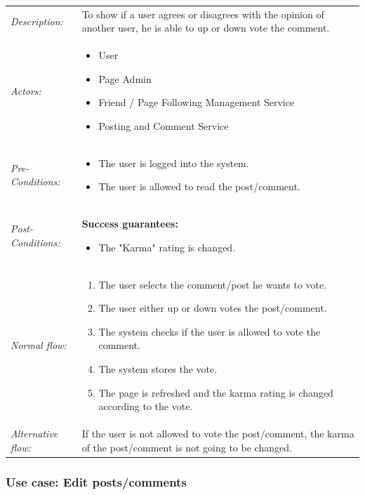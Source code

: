 \documentclass[11pt,a4paper]{report}
\begin{document}
\begin{longtable}{p{} | p{}}
        \hline
        \emph{Description:} & To show if a user agrees or disagrees with the opinion of another user, he is able to up or down vote the comment.\\
        \emph{Actors:} & 
            \begin{itemize} 
                \item User
                \item Page Admin
                \item Friend / Page Following Management Service
                \item Posting and Comment Service
             \end{itemize} \\
        \emph{Pre-Conditions:} & 
            \begin{itemize} 
                \item The user is logged into the system.
                \item The user is allowed to read the post/comment.
             \end{itemize} \\
        \emph{Post-Conditions:} & \textbf{Success guarantees:} 
            \begin{itemize} 
                \item The "Karma" rating is changed.
            \end{itemize} \\
        \emph{Normal flow:} & 
            \begin{enumerate} 
                \item The user selects the comment/post he wants to vote.
                \item The user either up or down votes the post/comment.
                \item The system checks if the user is allowed to vote the comment.
                \item The system stores the vote.
                \item The page is refreshed and the karma rating is changed according to the vote.
             \end{enumerate} \\
        \emph{Alternative flow:} & If the user is not allowed to vote the post/comment, the karma of the post/comment is not going to be changed.\\ 
             \hline
\end{longtable}

\subsubsection{Use case: Edit posts/comments}
\end{document}
